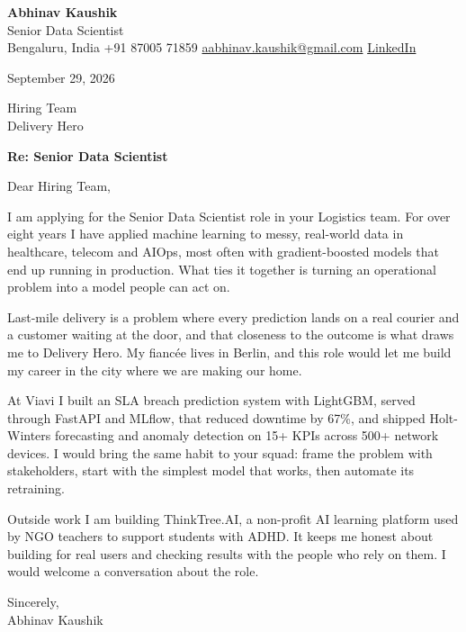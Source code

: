 \documentclass[11pt,a4paper]{article}
\begin{document}
{\Large\bfseries Abhinav Kaushik}\\
Senior Data Scientist\\
Bengaluru, India \textbar{} +91 87005 71859 \textbar{} \href{mailto:aabhinav.kaushik@gmail.com}{aabhinav.kaushik@gmail.com} \textbar{} \href{https://www.linkedin.com/in/abhinav-kaushik10/}{LinkedIn}  

September 29, 2026

Hiring Team\\
Delivery Hero

\textbf{Re: Senior Data Scientist}

Dear Hiring Team,

I am applying for the Senior Data Scientist role in your Logistics team. For over eight years I have applied machine learning to messy, real-world data in healthcare, telecom and AIOps, most often with gradient-boosted models that end up running in production. What ties it together is turning an operational problem into a model people can act on.

Last-mile delivery is a problem where every prediction lands on a real courier and a customer waiting at the door, and that closeness to the outcome is what draws me to Delivery Hero. My fiancée lives in Berlin, and this role would let me build my career in the city where we are making our home.

At Viavi I built an SLA breach prediction system with LightGBM, served through FastAPI and MLflow, that reduced downtime by 67\%, and shipped Holt-Winters forecasting and anomaly detection on 15+ KPIs across 500+ network devices. I would bring the same habit to your squad: frame the problem with stakeholders, start with the simplest model that works, then automate its retraining.

Outside work I am building ThinkTree.AI, a non-profit AI learning platform used by NGO teachers to support students with ADHD. It keeps me honest about building for real users and checking results with the people who rely on them. I would welcome a conversation about the role.

Sincerely,\\[4pt]
Abhinav Kaushik
\end{document}

